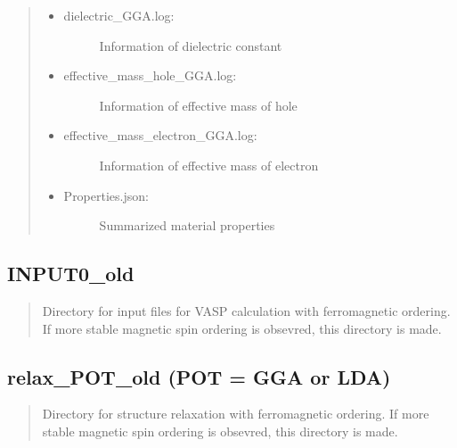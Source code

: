 \documentclass[letterpaper,10pt,english]{sphinxmanual}
\begin{document}
\begin{quote}
\begin{itemize}
\item {} \begin{description}
\item[{dielectric\_GGA.log:}] \leavevmode
Information of dielectric constant

\end{description}

\item {} \begin{description}
\item[{effective\_mass\_hole\_GGA.log:}] \leavevmode
Information of effective mass of hole

\end{description}

\item {} \begin{description}
\item[{effective\_mass\_electron\_GGA.log:}] \leavevmode
Information of effective mass of electron

\end{description}

\item {} \begin{description}
\item[{Properties.json:}] \leavevmode
Summarized material properties

\end{description}

\end{itemize}
\end{quote}


\subsection{INPUT0\_old}
\label{\detokenize{Output/Output:input0-old}}\begin{quote}

Directory for input files for VASP calculation with ferromagnetic ordering.
If more stable magnetic spin ordering is obsevred, this directory is made.
\end{quote}


\subsection{relax\_POT\_old (POT = GGA or LDA)}
\label{\detokenize{Output/Output:relax-pot-old-pot-gga-or-lda}}\begin{quote}

Directory for structure relaxation with ferromagnetic ordering.
If more stable magnetic spin ordering is obsevred, this directory is made.
\end{quote}
\end{document}
